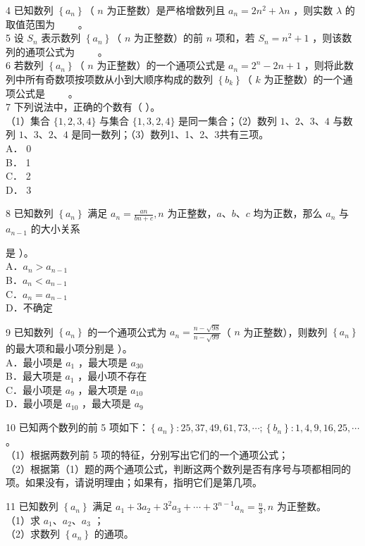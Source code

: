 \documentclass[10pt]{article}
\begin{document}
4 已知数列 \(\left\{a_{n}\right\}\)（ \(n\) 为正整数）是严格增数列且 \(a_{n}=2 n^{2}+\lambda n\) ，则实数 \(\lambda\) 的取值范围为 \(\qquad\)。\\
5 设 \(S_{n}\) 表示数列 \(\left\{a_{n}\right\}\)（ \(n\) 为正整数）的前 \(n\) 项和，若 \(S_{n}=n^{2}+1\) ，则该数列的通项公式为 \(\qquad\)。\\
6 若数列 \(\left\{a_{n}\right\}\)（ \(n\) 为正整数）的一个通项公式是 \(a_{n}=2^{n}-2 n+1\) ，则将此数列中所有奇数项按项数从小到大顺序构成的数列 \(\left\{b_{k}\right\}\)（ \(k\) 为正整数）的一个通项公式是 \(\qquad\)。\\
7 下列说法中，正确的个数有（ ）。\\
（1）集合 \(\{1,2,3,4\}\) 与集合 \(\{1,3,2,4\}\) 是同一集合；（2）数列 \(1 、 2 、 3 、 4\) 与数列 \(1 、 3 、 2 、 4\) 是同一数列；（3）数列1、1、2、3共有三项。\\
A． 0\\
B． 1\\
C． 2\\
D． 3

8 已知数列 \(\left\{a_{n}\right\}\) 满足 \(a_{n}=\frac{a n}{b n+c}, n\) 为正整数，\(a 、 b 、 c\) 均为正数，那么 \(a_{n}\) 与 \(a_{n-1}\) 的大小关系

是 ）。\\
A．\(a_{n}>a_{n-1}\)\\
B．\(a_{n}<a_{n-1}\)\\
C．\(a_{n}=a_{n-1}\)\\
D．不确定

9 已知数列 \(\left\{a_{n}\right\}\) 的一个通项公式为 \(a_{n}=\frac{n-\sqrt{98}}{n-\sqrt{99}}\)（ \(n\) 为正整数），则数列 \(\left\{a_{n}\right\}\) 的最大项和最小项分别是 ）。\\
A．最小项是 \(a_{1}\) ，最大项是 \(a_{30}\)\\
B．最大项是 \(a_{1}\) ，最小项不存在\\
C．最小项是 \(a_{9}\) ，最大项是 \(a_{10}\)\\
D．最小项是 \(a_{10}\) ，最大项是 \(a_{9}\)

10 已知两个数列的前 5 项如下：\(\left\{a_{n}\right\}: 25,37,49,61,73, \cdots ;\left\{b_{n}\right\}: 1,4,9,16,25, \cdots\) 。\\
（1）根据两数列前 5 项的特征，分别写出它们的一个通项公式；\\
（2）根据第（1）题的两个通项公式，判断这两个数列是否有序号与项都相同的项。如果没有，请说明理由；如果有，指明它们是第几项。

11 已知数列 \(\left\{a_{n}\right\}\) 满足 \(a_{1}+3 a_{2}+3^{2} a_{3}+\cdots+3^{n-1} a_{n}=\frac{n}{3}, n\) 为正整数。\\
（1）求 \(a_{1} 、 a_{2} 、 a_{3}\) ；\\
（2）求数列 \(\left\{a_{n}\right\}\) 的通项。
\end{document}
